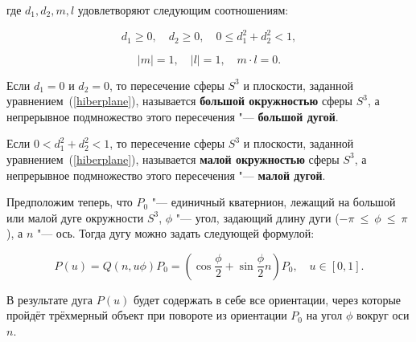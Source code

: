 \noindent где $d_1,d_2,m,l$ удовлетворяют следующим соотношениям:

$$
d_1 \ge 0, \quad d_2 \ge 0, \quad 0 \le d_1^2+d_2^2<1,
$$

$$
|m|=1, \quad |l|=1, \quad m \cdot l = 0.
$$

\begin{definition}
Если $d_1=0$ и $d_2=0$, то пересечение сферы $S^3$ и плоскости, заданной уравнением~(\ref{hiberplane}), называется
\textbf{большой окружностью} сферы $S^3$, а непрерывное подмножество этого пересечения "--- \textbf{большой дугой}.
\end{definition}

\begin{definition}
Если $0<d_1^2+d_2^2<1$, то пересечение сферы $S^3$ и плоскости, заданной уравнением~(\ref{hiberplane}), называется
\textbf{малой окружностью} сферы $S^3$, а непрерывное подмножество этого пересечения "--- \textbf{малой дугой}.
\end{definition}

Предположим теперь, что $P_0$ "--- единичный кватернион, лежащий на большой или малой дуге окружности $S^3$, $\phi$
"--- угол, задающий длину дуги ($-\pi~\le~\phi~\le~\pi$), а $n$ "--- ось. Тогда дугу можно задать следующей
формулой:

$$
P(u)=Q(n,u\phi)P_0=(\cos\frac{\phi}{2}+\sin\frac{\phi}{2}n)P_0, \quad u \in [0,1].
$$

В результате дуга $P(u)$ будет содержать в себе все ориентации, через которые пройдёт трёхмерный объект при повороте
из ориентации $P_0$ на угол $\phi$ вокруг оси $n$.
